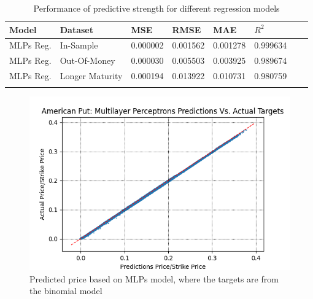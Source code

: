 \begin{table}[H]
\caption{Performance of predictive strength for different regression models}
\label{tab:euroPerformanceComparision}
\centering
\begin{tabular}{l l l l l l l l }
\toprule
\textbf{Model} & \textbf{Dataset} & \textbf{MSE} & \textbf{RMSE} & \textbf{MAE} & \textbf{$R^2$} \\
\midrule
MLPs Reg. & In-Sample & 0.000002 & 0.001562 & 0.001278 & 0.999634\\
MLPs Reg. & Out-Of-Money & 0.000030 & 0.005503 & 0.003925 & 0.989674\\
MLPs Reg. & Longer Maturity & 0.000194 & 0.013922 & 0.010731 & 0.980759\\
\bottomrule\\
\end{tabular}
\end{table}

\begin{figure}[H]
\centering
\includegraphics{Figures/PredictionAmerP.png}
\decoRule
\caption[MLPs Predictions Vs. Actual Prices For American Put]{Predicted price based on MLPs model, where the targets are from the binomial model}
\label{fig:PredictionAmerP}
\end{figure}

